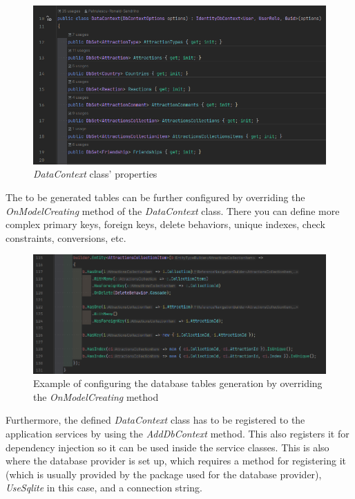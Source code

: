 \begin{figure}[!ht]
    \centering
    \includegraphics[width=1\linewidth]{4.3.1_dataContext.png}
    \caption{\textit{DataContext} class' properties}
    \label{fig:enter-label}
\end{figure}

\par The to be generated tables can be further configured by overriding the \textit{OnModelCreating} method of the \textit{DataContext} class. There you can define more complex primary keys, foreign keys, delete behaviors, unique indexes, check constraints, conversions, etc.

\clearpage %

\begin{figure}[!ht]
    \centering
    \includegraphics[width=0.95\linewidth]{4.3.1_sample-of-OnModelCreating.png}
    \caption{Example of configuring the database tables generation by overriding the \textit{OnModelCreating} method}
    \label{fig:enter-label}
\end{figure}

\par Furthermore, the defined \textit{DataContext} class has to be registered to the application services by using the \textit{AddDbContext} method. This also registers it for dependency injection so it can be used inside the service classes. This is also where the database provider is set up, which requires a method for registering it (which is usually provided by the package used for the database provider), \textit{UseSqlite} in this case, and a connection string.

